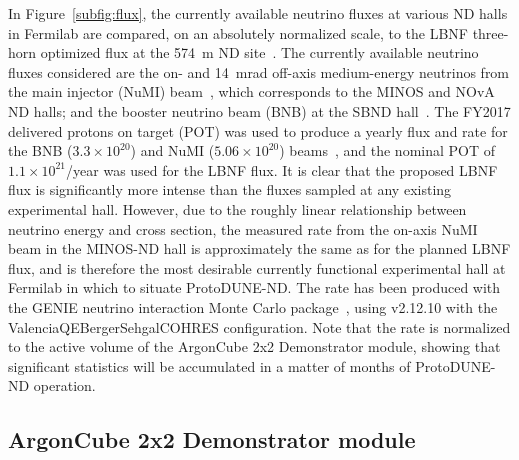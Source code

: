 In Figure~\ref{subfig:flux}, the currently available neutrino fluxes at various ND halls in Fermilab are compared, on an absolutely normalized scale, to the LBNF three-horn optimized flux at the \SI{574}{\metre} ND site~\cite{dune_opt_flux}. The currently available neutrino fluxes considered are the on- and \SI{14}{\milli\radian} off-axis medium-energy neutrinos from the main injector (NuMI) beam~\cite{numi}, which corresponds to the MINOS and NOvA ND halls; and the booster neutrino beam (BNB) at the SBND hall~\cite{Antonello:2015lea}. The FY2017 delivered protons on target (POT) was used to produce a yearly flux and rate for the BNB ($3.3\times 10^{20}$) and NuMI ($5.06\times 10^{20}$) beams~\cite{fnal_beam_2017}, and the nominal POT of $1.1 \times 10^{21}$/year was used for the LBNF flux. It is clear that the proposed LBNF flux is significantly more intense than the fluxes sampled at any existing experimental hall. However, due to the roughly linear relationship between neutrino energy and cross section, the measured rate from the on-axis NuMI beam in the MINOS-ND hall is approximately the same as for the planned LBNF flux, and is therefore the most desirable currently functional experimental hall at Fermilab in which to situate ProtoDUNE-ND. The rate has been produced with the GENIE neutrino interaction Monte Carlo package~\cite{genie}, using v2.12.10 with the ValenciaQEBergerSehgalCOHRES configuration. Note that the rate is normalized to the active volume of the ArgonCube 2x2 Demonstrator module, showing that significant statistics will be accumulated in a matter of months of ProtoDUNE-ND operation.

\FloatBarrier

\subsection{ArgonCube 2x2 Demonstrator module}
\label{sec:2x2-design}

